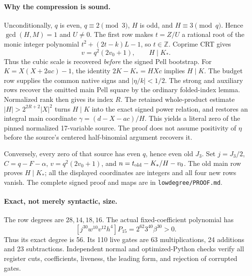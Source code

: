 \paragraph{Why the compression is sound.}
Unconditionally, $q$ is even, $q\equiv2\pmod3$, $H$ is odd, and
$H\equiv3\pmod q$.  Hence $\gcd(H,M)=1$ and $U\ne0$.
The first row makes $t=Z/U$ a rational root of the monic integer polynomial
$t^2+(2t-k)L-1$, so $t\in\mathbb Z$.  Coprime CRT gives
\[
 v=q^2(2v_0+1),\qquad H\mid K_*.
\]
Thus the cubic scale is recovered \emph{before} the signed Pell bootstrap.
For $K=X(X+2ac)-1$, the identity $2K-K_*=HXc$ implies $H\mid K$.
The budget row supplies the common native signs and $|\eta/k|<1/2$.
The strong and auxiliary rows recover the omitted main Pell square by the
ordinary folded-index lemma.  Normalized rank then gives its index $R$.
The retained whole-product estimate
$|H|>2^{2R+2}|X|^2$ turns $H\mid K$ into the exact signed power relation,
and restores an integral main coordinate
$\gamma=(d-X-ac)/H$.  This yields a literal zero of the pinned normalized
17-variable source.  The proof does not assume positivity of $\eta$ before
the source's centered half-binomial argument recovers it.

Conversely, every zero of that source has even $q$, hence even old $J_3$.
Set $j=J_3/2$, $C=q-F-\alpha$, $v=q^2(2v_0+1)$, and
$n=t_{\rm old}-K_*/H-v_0$.  The old main row proves $H\mid K_*$;
all the displayed coordinates are integers and all four new rows vanish.
The complete signed proof and maps are in \texttt{lowdegree/PROOF.md}.

\paragraph{Exact, not merely syntactic, size.}
The row degrees are $28,14,18,16$.  The actual fixed-coefficient polynomial has
\[
 [j^{30}w^{10}v^{12}h^4]P_{15}=2^{62}3^{40}\beta^{30}>0.
\]
Thus its exact degree is 56.  Its 110 live gates are 63 multiplications,
24 additions and 23 subtractions.  Independent normal and optimized-Python
checks verify all register cuts, coefficients, liveness, the leading form,
and rejection of corrupted gates.

